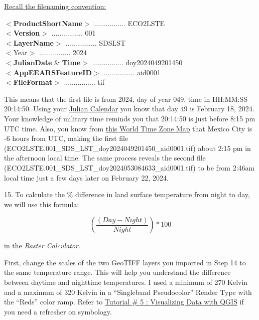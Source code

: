 \documentclass[oneside,a4paper,11pt,explicit]{book}
\begin{document}
\underline{Recall the filenaming convention:}

    $<$\textbf{ProductShortName}$>$ ................ ECO2LSTE \\
    $<$\textbf{Version}$>$ ................ 001  \\
    $<$\textbf{LayerName}$>$ ................ SDS\textunderscore LST \\
    $<$Year$>$ ................ 2024  \\
    $<$\textbf{JulianDate} \& \textbf{Time}$>$ ................ doy2024049201450  \\
    $<$\textbf{AppEEARSFeatureID}$>$ ................ aid0001 \\
    $<$\textbf{FileFormat}$>$ ................ tif

\vspace{.5em}

This means that the first file is from 2024, day of year 049, time in HH:MM:SS 20:14:50. Using your \href{https://jeremydforsythe.github.io/icecream-tutorials/Tutorial4_AccessingRemoteSensingDataWithAppears/Julian_Calendar.png}{Julian Calendar} you know that day 49 is February 18, 2024. Your knowledge of military time reminds you that 20:14:50 is just before 8:15 pm UTC time. Also, you know from \href{https://jeremydforsythe.github.io/icecream-tutorials/Tutorial11_RasterCalculator/World_Time_Zones_Map.png}{this World Time Zone Map} that Mexico City is -6 hours from UTC, making the first file (ECO2LSTE.001\_SDS\_LST\_doy2024049201450\_aid0001.tif) about 2:15 pm in the afternoon local time. The same process reveals the second file \\(ECO2LSTE.001\_SDS\_LST\_doy2024053084633\_aid0001.tif) to be from 2:46am local time just a few days later on February 22, 2024. 

15. To calculate the \% difference in land surface temperature from night to day, we will use this formula:

\begin{equation}
    \left(\frac{(Day - Night)}{Night}\right) * 100
\end{equation}

in the \textit{Raster Calculator}. 

First, change the scales of the two GeoTIFF layers you imported in Step 14 to the same temperature range. This will help you understand the difference between daytime and nighttime temperatures. I used a minimum of 270 Kelvin and a maximum of 320 Kelvin in a ``Singleband Pseudocolor'' Render Type with the ``Reds'' color ramp. Refer to \href{https://jeremydforsythe.github.io/icecream-tutorials/Tutorial5_VisualizingDataWithQGIS/Tutorial5_VisualizingDataWithQGIS.pdf}{Tutorial \# 5 : Visualizing Data with QGIS} if you need a refresher on symbology.
\end{document}
